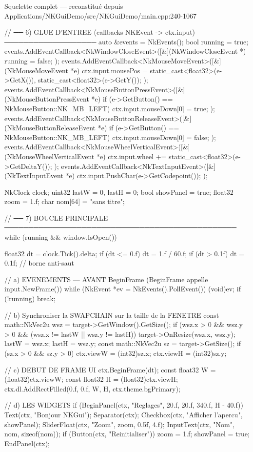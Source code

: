 \begin{nkcode}{Squelette complet — reconstitué depuis Applications/NKGuiDemo/src/NKGuiDemo/main.cpp:240-1067}
{    // ── 6) GLUE D'ENTREE (callbacks NKEvent -> ctx.input) ───────────────────
    auto &events = NkEvents();
    bool running = true;
    events.AddEventCallback<NkWindowCloseEvent>([&](NkWindowCloseEvent *) { running = false; });
    events.AddEventCallback<NkMouseMoveEvent>([&](NkMouseMoveEvent *e) {
        ctx.input.mousePos = {static_cast<float32>(e->GetX()), static_cast<float32>(e->GetY())};
    });
    events.AddEventCallback<NkMouseButtonPressEvent>([&](NkMouseButtonPressEvent *e) {
        if (e->GetButton() == NkMouseButton::NK_MB_LEFT) ctx.input.mouseDown[0] = true;
    });
    events.AddEventCallback<NkMouseButtonReleaseEvent>([&](NkMouseButtonReleaseEvent *e) {
        if (e->GetButton() == NkMouseButton::NK_MB_LEFT) ctx.input.mouseDown[0] = false;
    });
    events.AddEventCallback<NkMouseWheelVerticalEvent>([&](NkMouseWheelVerticalEvent *e) {
        ctx.input.wheel += static_cast<float32>(e->GetDeltaY());
    });
    events.AddEventCallback<NkTextInputEvent>([&](NkTextInputEvent *e) {
        ctx.input.PushChar(e->GetCodepoint());
    });

    NkClock clock;
    uint32 lastW = 0, lastH = 0;
    bool showPanel = true;
    float32 zoom = 1.f;
    char nom[64] = "sans titre";

    // ── 7) BOUCLE PRINCIPALE ────────────────────────────────────────────────
    while (running && window.IsOpen()) {
        float32 dt = clock.Tick().delta;
        if (dt <= 0.f)  dt = 1.f / 60.f;
        if (dt >  0.1f) dt = 0.1f;                       // borne anti-saut

        // a) EVENEMENTS — AVANT BeginFrame (BeginFrame appelle input.NewFrame())
        while (NkEvent *ev = NkEvents().PollEvent()) { (void)ev; }
        if (!running) break;

        // b) Synchroniser la SWAPCHAIN sur la taille de la FENETRE
        const math::NkVec2u wsz = target->GetWindow().GetSize();
        if (wsz.x > 0 && wsz.y > 0 && (wsz.x != lastW || wsz.y != lastH)) {
            target->OnResize(wsz.x, wsz.y);
            lastW = wsz.x; lastH = wsz.y;
        }
        const math::NkVec2u sz = target->GetSize();
        if (sz.x > 0 && sz.y > 0) { ctx.viewW = (int32)sz.x; ctx.viewH = (int32)sz.y; }

        // c) DEBUT DE FRAME UI
        ctx.BeginFrame(dt);
        const float32 W = (float32)ctx.viewW;
        const float32 H = (float32)ctx.viewH;
        ctx.dl.AddRectFilled({0.f, 0.f, W, H}, ctx.theme.bgPrimary);

        // d) LES WIDGETS
        if (BeginPanel(ctx, "Reglages", {20.f, 20.f, 340.f, H - 40.f})) {
            Text(ctx, "Bonjour NKGui");
            Separator(ctx);
            Checkbox(ctx, "Afficher l'apercu", showPanel);
            SliderFloat(ctx, "Zoom", zoom, 0.5f, 4.f);
            InputText(ctx, "Nom", nom, sizeof(nom));
            if (Button(ctx, "Reinitialiser")) {
                zoom = 1.f;
                showPanel = true;
            }
            EndPanel(ctx);
        }

}}
\end{nkcode}
